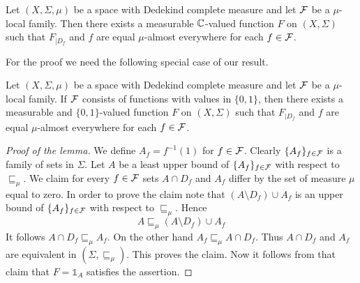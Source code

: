 \begin{theorem}\label{theorem:on_Dedekind_complete_local_families_can_be_glued}
  Let $(X,\Sigma,\mu)$ be a space with Dedekind complete measure and let ${\mathcal F}$ be a $\mu$-local family. Then there exists a measurable ${\mathbb C}$-valued function $F$ on $(X,\Sigma)$ such that $F_{\mid D_f}$ and $f$ are equal $\mu$-almost everywhere for each $f \in {\mathcal F}$.
\end{theorem}
\noindent
For the proof we need the following special case of our result.

\begin{lemma}\label{lemma:glueing_indicators_on_Dedekind_complete_measure}
  Let $(X,\Sigma,\mu)$ be a space with Dedekind complete measure and let ${\mathcal F}$ be a $\mu$-local family. If ${\mathcal F}$ consists of functions with values in $\{0,1\}$, then there exists a measurable and $\{0,1\}$-valued function $F$ on $(X,\Sigma)$ such that $F_{\mid D_f}$ and $f$ are equal $\mu$-almost everywhere for each $f \in {\mathcal F}$.
\end{lemma}
\begin{proof}[Proof of the lemma]
  We define $A_f = f^{-1}(1)$ for $f \in {\mathcal F}$. Clearly $\{A_f\}_{f\in {\mathcal F}}$ is a family of sets in $\Sigma$. Let $A$ be a least upper bound of $\{A_{f}\}_{f\in {\mathcal F}}$ with respect to $\sqsubseteq_{\mu}$. We claim for every $f \in {\mathcal F}$ sets $A\cap D_f$ and $A_f$ differ by the set of measure $\mu$ equal to zero. In order to prove the claim note that $\left(A \setminus D_f\right) \cup A_{f}$ is an upper bound of $\{A_{f}\}_{f\in {\mathcal F}}$ with respect to $\sqsubseteq_{\mu}$. Hence
  $$A \sqsubseteq_{\mu} \left(A \setminus D_f\right) \cup A_{f}$$
  It follows $A \cap D_f \sqsubseteq_{\mu} A_{f}$. On the other hand $A_f \sqsubseteq_{\mu} A\cap D_f$. Thus $A \cap D_f$ and $A_{f}$ are equivalent in $\left(\Sigma, \sqsubseteq_{\mu}\right)$. This proves the claim. Now it follows from that claim that $F = \mathbb{1}_{A}$ satisfies the assertion.
\end{proof}

